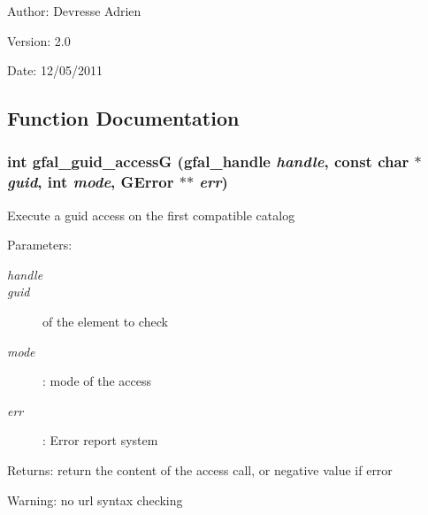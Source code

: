 \begin{Desc}
\item[Author:]Devresse Adrien \end{Desc}
\begin{Desc}
\item[Version:]2.0 \end{Desc}
\begin{Desc}
\item[Date:]12/05/2011 \end{Desc}


\subsection{Function Documentation}
\subsubsection{\setlength{\rightskip}{0pt plus 5cm}int gfal\_\-guid\_\-access\-G (gfal\_\-handle {\em handle}, const char $\ast$ {\em guid}, int {\em mode}, GError $\ast$$\ast$ {\em err})}\label{gfal__common__guid_8c_55770e13f0626b60b830e3254df7ee9d}


Execute a guid access on the first compatible catalog \begin{Desc}
\item[Parameters:]
\begin{description}
\item[{\em handle}]\item[{\em guid}]of the element to check \item[{\em mode}]: mode of the access \item[{\em err}]: Error report system \end{description}
\end{Desc}
\begin{Desc}
\item[Returns:]return the content of the access call, or negative value if error \end{Desc}
\begin{Desc}
\item[Warning:]no url syntax checking \end{Desc}
